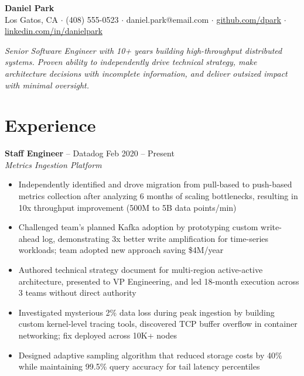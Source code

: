 \documentclass[10pt,letterpaper]{article}
\begin{document}
\noindent\colorbox{darkbg}{\parbox{\dimexpr\textwidth+0pt}{%
\vspace{10pt}
\centering
{\color{white}\LARGE\bfseries Daniel Park}\\[5pt]
{\color{gray!60}\small Los Gatos, CA $\cdot$ (408) 555-0523 $\cdot$ daniel.park@email.com $\cdot$ \href{https://github.com/dpark}{\color{accent}github.com/dpark} $\cdot$ \href{https://linkedin.com/in/danielpark}{\color{accent}linkedin.com/in/danielpark}}
\vspace{10pt}
}}

\vspace{8pt}

{\small\itshape Senior Software Engineer with 10+ years building high-throughput distributed systems. Proven ability to independently drive technical strategy, make architecture decisions with incomplete information, and deliver outsized impact with minimal oversight.}

\section{Experience}

\textbf{Staff Engineer} -- Datadog \hfill {\small Feb 2020 -- Present}\\
{\footnotesize\color{accent}\itshape Metrics Ingestion Platform}
\begin{itemize}
    \item Independently identified and drove migration from pull-based to push-based metrics collection after analyzing 6 months of scaling bottlenecks, resulting in 10x throughput improvement (500M to 5B data points/min)
    \item Challenged team's planned Kafka adoption by prototyping custom write-ahead log, demonstrating 3x better write amplification for time-series workloads; team adopted new approach saving \$4M/year
    \item Authored technical strategy document for multi-region active-active architecture, presented to VP Engineering, and led 18-month execution across 3 teams without direct authority
    \item Investigated mysterious 2\% data loss during peak ingestion by building custom kernel-level tracing tools, discovered TCP buffer overflow in container networking; fix deployed across 10K+ nodes
    \item Designed adaptive sampling algorithm that reduced storage costs by 40\% while maintaining 99.5\% query accuracy for tail latency percentiles
\end{itemize}
\end{document}
